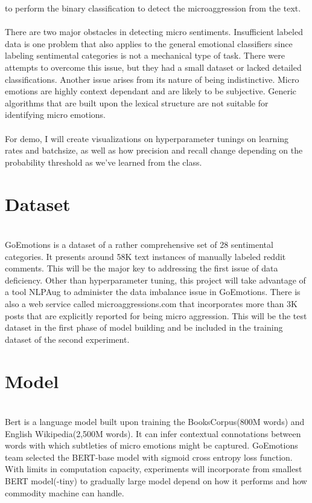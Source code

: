\documentclass[12pt]{main}
\begin{document}
to perform the binary classification to detect the microaggression from the text.  
\vspace{-2mm}\\
\\
There are two major obstacles in detecting micro sentiments.
Insufficient labeled data is one problem that also applies to the general emotional classifiers
since labeling sentimental categories is not a mechanical type of task.
There were attempts\cite{AffectiveText}\cite{Mohammad2018-gv} to overcome this issue,
but they had a small dataset or lacked detailed classifications.
Another issue arises from its nature of being indistinctive.
Micro emotions are highly context dependant and are likely to be subjective.
Generic algorithms that are built upon the lexical structure are not suitable for identifying micro emotions.
\vspace{-2mm}\\
\\
For demo, I will create visualizations on hyperparameter tunings on learning rates and batchsize,
as well as how precision and recall change depending on the probability threshold as we’ve learned from the class. 


\section*{Dataset}
\\
GoEmotions\cite{goEmotions} is a dataset of a rather comprehensive set of 28 sentimental categories.
It presents around 58K text instances of manually labeled reddit comments.
This will be the major key to addressing the first issue of data deficiency.
Other than hyperparameter tuning, this project will take advantage of a tool NLPAug\cite{ma2019nlpaug}
to administer the data imbalance issue in GoEmotions.
There is also a web service called microaggressions.com\cite{Co_undated-sh}
that incorporates more than 3K posts that are explicitly reported for being micro aggression.
This will be the test dataset in the first phase of model building
and be included in the training dataset of the second experiment.
\vspace{-2mm}\\


\section*{Model}
\\
Bert\cite{bert} is a language model built upon training the BooksCorpus(800M words) and English Wikipedia(2,500M words).
It can infer contextual connotations between words with which subtleties of micro emotions might be captured.
GoEmotions team selected the BERT-base model with sigmoid cross entropy loss function.
With limits in computation capacity, experiments will incorporate from smallest BERT model(-tiny)
to gradually large model depend on how it performs and how commodity machine can handle.
\vspace{-2mm}\\
\\
\end{document}
